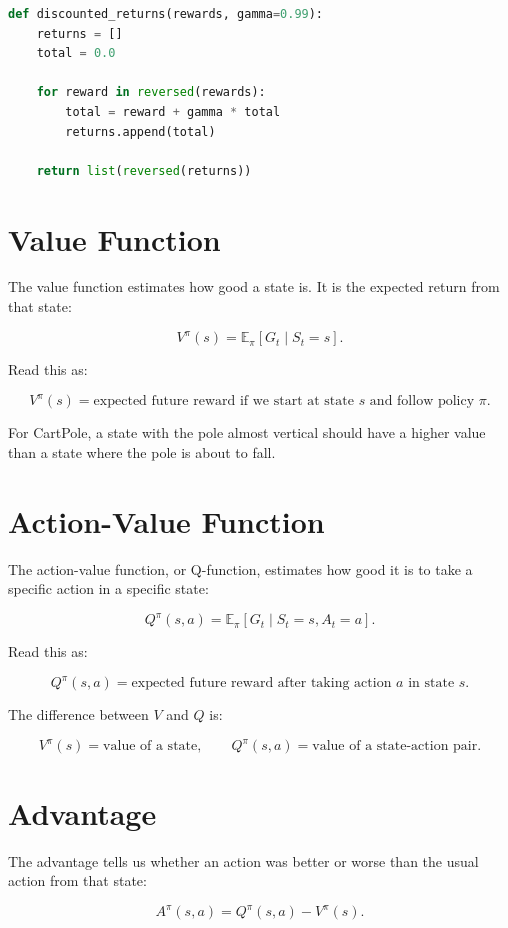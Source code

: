 \documentclass[11pt]{article}
\begin{document}
\begin{lstlisting}[language=Python]
def discounted_returns(rewards, gamma=0.99):
    returns = []
    total = 0.0

    for reward in reversed(rewards):
        total = reward + gamma * total
        returns.append(total)

    return list(reversed(returns))
\end{lstlisting}

\section{Value Function}

The value function estimates how good a state is.
It is the expected return from that state:

\[
V^\pi(s)
=
\mathbb{E}_\pi[G_t \mid S_t=s].
\]

Read this as:

\[
\boxed{
V^\pi(s) = \text{expected future reward if we start at state } s
\text{ and follow policy } \pi.
}
\]

For CartPole, a state with the pole almost vertical should have a higher value than a state where the pole is about to fall.

\section{Action-Value Function}

The action-value function, or Q-function, estimates how good it is to take a specific action in a specific state:

\[
Q^\pi(s,a)
=
\mathbb{E}_\pi[G_t \mid S_t=s, A_t=a].
\]

Read this as:

\[
\boxed{
Q^\pi(s,a) = \text{expected future reward after taking action } a
\text{ in state } s.
}
\]

The difference between $V$ and $Q$ is:

\[
V^\pi(s) = \text{value of a state},
\qquad
Q^\pi(s,a) = \text{value of a state-action pair}.
\]

\section{Advantage}

The advantage tells us whether an action was better or worse than the usual action from that state:

\[
A^\pi(s,a)
=
Q^\pi(s,a) - V^\pi(s).
\]
\end{document}
